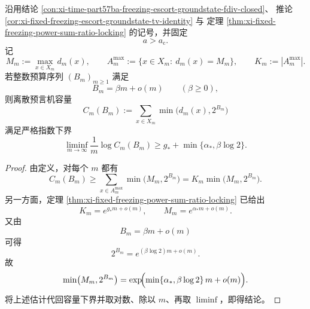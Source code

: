 \begin{theorem}[冻结相最大纤维扇区给出的预言机容量指数下界]\label{thm:xi-time-part65ca-frozen-max-sector-oracle-capacity-lower-bound}
沿用结论 \ref{con:xi-time-part57ba-freezing-escort-groundstate-fdiv-closed}、
推论 \ref{cor:xi-fixed-freezing-escort-groundstate-tv-identity} 与
定理 \ref{thm:xi-fixed-freezing-power-sum-ratio-locking} 的记号，并固定
\[
a>a_{\mathrm c}.
\]
记
\[
M_m:=\max_{x\in X_m}d_m(x),
\qquad
A_m^{\max}:=\{x\in X_m:\ d_m(x)=M_m\},
\qquad
K_m:=|A_m^{\max}|.
\]
若整数预算序列 \((B_m)_{m\ge 1}\) 满足
\[
B_m=\beta m+o(m)
\qquad(\beta\ge 0),
\]
则离散预言机容量
\[
C_m(B_m):=\sum_{x\in X_m}\min\bigl(d_m(x),2^{B_m}\bigr)
\]
满足严格指数下界
\[
\boxed{\;
\liminf_{m\to\infty}\frac{1}{m}\log C_m(B_m)
\ge
g_*+\min\{\alpha_*,\beta\log 2\}.\;}
\]
\end{theorem}
\begin{proof}
由定义，对每个 \(m\) 都有
\[
C_m(B_m)
\ge
\sum_{x\in A_m^{\max}}\min\bigl(M_m,2^{B_m}\bigr)
=
K_m\min\bigl(M_m,2^{B_m}\bigr).
\]
另一方面，定理 \ref{thm:xi-fixed-freezing-power-sum-ratio-locking} 已给出
\[
K_m=e^{g_*m+o(m)},
\qquad
M_m=e^{\alpha_*m+o(m)}.
\]
又由
\[
B_m=\beta m+o(m)
\]
可得
\[
2^{B_m}=e^{(\beta\log 2)m+o(m)}.
\]
故
\[
\min\bigl(M_m,2^{B_m}\bigr)
=
\exp\!\Bigl(
\min\{\alpha_*,\beta\log 2\}\,m+o(m)
\Bigr).
\]
将上述估计代回容量下界并取对数、除以 \(m\)、再取 \(\liminf\)，即得结论。
\end{proof}

